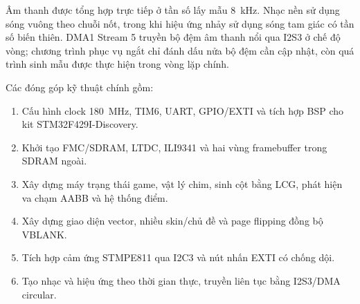 Âm thanh được tổng hợp trực tiếp ở tần số lấy mẫu \SI{8}{\kilo\hertz}. Nhạc nền sử dụng sóng vuông theo chuỗi nốt, trong khi hiệu ứng nhảy sử dụng sóng tam giác có tần số biến thiên. DMA1 Stream 5 truyền bộ đệm âm thanh nổi qua I2S3 ở chế độ vòng; chương trình phục vụ ngắt chỉ đánh dấu nửa bộ đệm cần cập nhật, còn quá trình sinh mẫu được thực hiện trong vòng lặp chính.

Các đóng góp kỹ thuật chính gồm:

\begin{enumerate}
  \item Cấu hình clock \SI{180}{\mega\hertz}, TIM6, UART, GPIO/EXTI và tích hợp BSP cho kit STM32F429I-Discovery.
  \item Khởi tạo FMC/SDRAM, LTDC, ILI9341 và hai vùng framebuffer trong SDRAM ngoài.
  \item Xây dựng máy trạng thái game, vật lý chim, sinh cột bằng LCG, phát hiện va chạm AABB và hệ thống điểm.
  \item Xây dựng giao diện vector, nhiều skin/chủ đề và page flipping đồng bộ VBLANK.
  \item Tích hợp cảm ứng STMPE811 qua I2C3 và nút nhấn EXTI có chống dội.
  \item Tạo nhạc và hiệu ứng theo thời gian thực, truyền liên tục bằng I2S3/DMA circular.
\end{enumerate}
